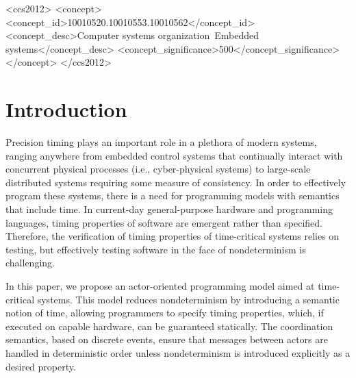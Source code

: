 \documentclass[sigconf]{acmart}
\begin{document}
%
%
\begin{CCSXML}
	<ccs2012>
	<concept>
	<concept_id>10010520.10010553.10010562</concept_id>
	<concept_desc>Computer systems organization~Embedded systems</concept_desc>
	<concept_significance>500</concept_significance>
	</concept>
	</ccs2012>  
\end{CCSXML}




\maketitle

\section{Introduction}\label{sec:intro}
Precision timing plays an important role in a plethora of modern systems, ranging anywhere from embedded control systems that continually interact with concurrent physical processes (i.e., cyber-physical systems) to large-scale distributed systems requiring some measure of consistency.
In order to effectively program these systems, there is a need for programming models with semantics that include time.
In current-day general-purpose hardware and programming languages, timing properties of software are emergent rather than specified.
Therefore, the verification of timing properties of time-critical systems relies on testing, but effectively testing software in the face of nondeterminism is challenging.

In this paper, we propose an actor-oriented programming model aimed at time-critical systems. This model reduces nondeterminism by introducing a semantic notion of time, allowing programmers to specify timing properties, which, if executed on capable hardware, can be guaranteed statically. The coordination semantics, based on discrete events, ensure that messages between actors are handled in deterministic order unless nondeterminism is introduced explicitly as a desired property.
\end{document}
